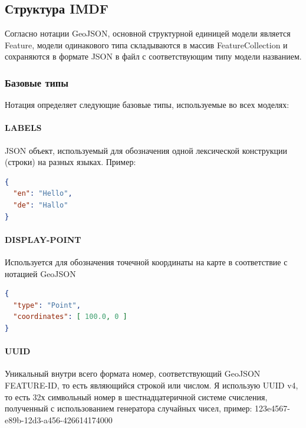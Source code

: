    \subsection{Структура IMDF}
      Согласно нотации GeoJSON, основной структурной единицей модели является Feature, модели одинакового типа складываются в массив FeatureCollection и сохраняются в формате JSON в файл с соответствующим типу модели названием.

      \subsubsection{Базовые типы}
        Нотация определяет следующие базовые типы, используемые во всех моделях:
        \paragraph{LABELS}
          JSON объект, используемый для обозначения одной лексической конструкции (строки) на разных языках. Пример:
          \begin{lstlisting}[language=json,caption={Пример модели LABELS}]
{
  "en": "Hello",
  "de": "Hallo"
}
          \end{lstlisting}

        \paragraph{DISPLAY-POINT}
          Используется для обозначения точечной координаты на карте в соответствие с нотацией GeoJSON
          \begin{lstlisting}[language=json,caption={Пример модели DISPLAY-POINT}]
{
  "type": "Point",
  "coordinates": [ 100.0, 0 ]
}
          \end{lstlisting}

        \paragraph{UUID}
          Уникальный внутри всего формата номер, соответствующий GeoJSON FEATURE-ID, то есть являющийся строкой или числом.
          Я использую UUID v4, то есть 32х символьный номер в шестнадцатеричной системе счисления, полученный с использованием генератора случайных чисел, пример: 123e4567-e89b-12d3-a456-426614174000

